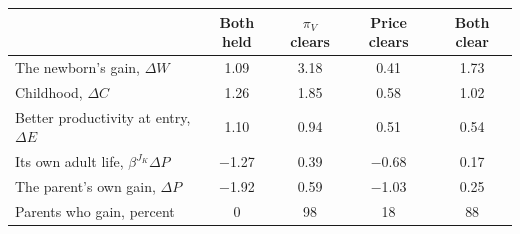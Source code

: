 \begin{tabular}{@{}lcccc@{}}
\toprule
 & Both held & $\pi_V$ clears & Price clears & Both clear \\
\midrule
The newborn's gain, $\Delta W$ & 1.09 & 3.18 & 0.41 & 1.73 \\
\quad Childhood, $\Delta C$ & 1.26 & 1.85 & 0.58 & 1.02 \\
\quad Better productivity at entry, $\Delta E$ & 1.10 & 0.94 & 0.51 & 0.54 \\
\quad Its own adult life, $\beta^{J_K}\Delta P$ & $-$1.27 & 0.39 & $-$0.68 & 0.17 \\
\midrule
The parent's own gain, $\Delta P$ & $-$1.92 & 0.59 & $-$1.03 & 0.25 \\
Parents who gain, percent & 0 & 98 & 18 & 88 \\
\bottomrule
\end{tabular}
